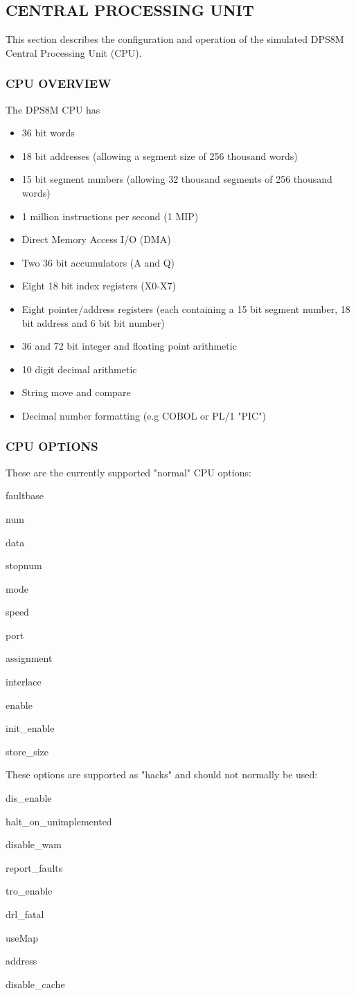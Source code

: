 \subsection[Central Processing Unit]{CENTRAL PROCESSING UNIT}

This section describes the configuration and operation of the simulated DPS8M Central Processing Unit (CPU).

\subsubsection[CPU Overview]{CPU OVERVIEW}

The DPS8M CPU has
\begin{itemize}
	\item 36 bit words
	\item 18 bit addresses (allowing a segment size of 256 thousand words)
	\item 15 bit segment numbers (allowing 32 thousand segments of 256 thousand words)
	\item 1 million instructions per second (1 MIP)
	\item Direct Memory Access I/O (DMA)
	\item Two 36 bit accumulators (A and Q)
	\item Eight 18 bit index registers (X0-X7)
	\item Eight pointer/address registers (each containing a 15 bit segment number, 18 bit address and 6 bit bit number)
	\item 36 and 72 bit integer and floating point arithmetic
	\item 10 digit decimal arithmetic
	\item String move and compare
	\item Decimal number formatting (e.g COBOL or PL/1 "PIC")
\end{itemize} 

\subsubsection[CPU Options]{CPU OPTIONS}

These are the currently supported "normal" CPU options:

faultbase

num

data

stopnum

mode

speed

port

assignment

interlace

enable

init\_enable

store\_size

These options are supported as "hacks" and should not normally be used:

dis\_enable

halt\_on\_unimplemented

disable\_wam

report\_faults

tro\_enable

drl\_fatal

useMap

address

disable\_cache
